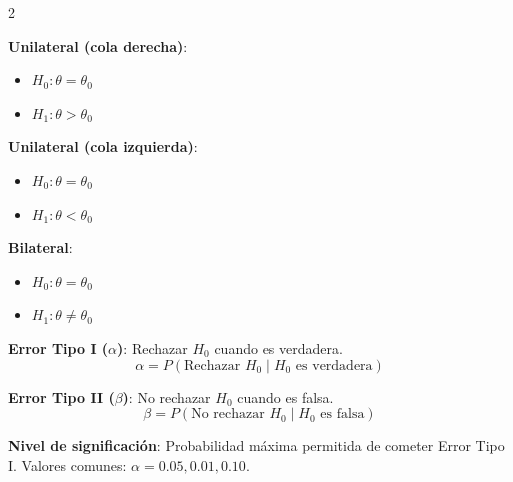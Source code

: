 \documentclass[10pt,a4paper]{article}
\begin{document}
\begin{multicols}{2}
    \begin{tcolorbox}[title=Tipos de Contrastes, equal height group=CH1]
        \textbf{Unilateral (cola derecha)}:
        \begin{itemize}
            \item $H_0: \theta = \theta_0$
            \item $H_1: \theta > \theta_0$
        \end{itemize}
        
        \textbf{Unilateral (cola izquierda)}:
        \begin{itemize}
            \item $H_0: \theta = \theta_0$
            \item $H_1: \theta < \theta_0$
        \end{itemize}
        
        \textbf{Bilateral}:
        \begin{itemize}
            \item $H_0: \theta = \theta_0$
            \item $H_1: \theta \neq \theta_0$
        \end{itemize}
    \end{tcolorbox}
    \begin{tcolorbox}[title=Errores en el Contraste, equal height group=CH1]
        \textbf{Error Tipo I ($\alpha$)}: Rechazar $H_0$ cuando es verdadera.
        \[
            \alpha = P(\text{Rechazar } H_0 \mid H_0 \text{ es verdadera})
        \]
        
        \textbf{Error Tipo II ($\beta$)}: No rechazar $H_0$ cuando es falsa.
        \[
            \beta = P(\text{No rechazar } H_0 \mid H_0 \text{ es falsa})
        \]
        
        \textbf{Nivel de significación}: Probabilidad máxima permitida de cometer Error Tipo I. Valores comunes: $\alpha = 0.05, 0.01, 0.10$.
    \end{tcolorbox}
\end{multicols}
\end{document}
